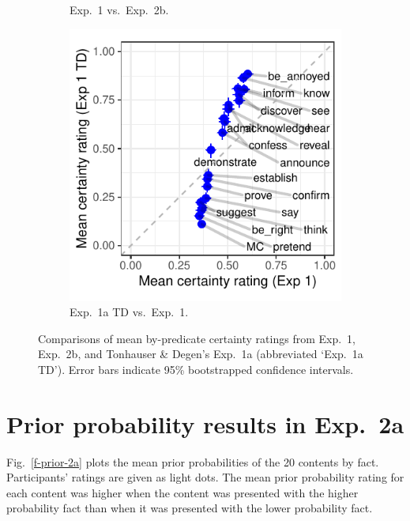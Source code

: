 \documentclass[11pt,fleqn]{article}
\newcommand{\figref}[1]{Fig.~\ref{#1}}
\newcommand{\6}{\mbox{$[\hspace*{-.6mm}[$}}
\newcommand{\9}{\mbox{$]\hspace*{-.6mm}]$}}
\begin{document}
\begin{figure}[h!]
\begin{subfigure}{.33\textwidth}
\caption{Exp.~1 vs.\ Exp.~2b.}
\label{f-projcomp2}
\end{subfigure}
\begin{subfigure}{.33\textwidth}
\includegraphics[width=\textwidth]{../../results/projection-comparisons/graphs/projection-comparison-59}
\caption{Exp.~1a TD vs.\  Exp.~1.}
\label{f-projcomp3}
\end{subfigure}
\caption{Comparisons of mean by-predicate certainty ratings from Exp.~1, Exp.~2b, and Tonhauser \& Degen's Exp.~1a (abbreviated `Exp.~1a TD'). Error bars indicate 95\% bootstrapped confidence intervals.}
\label{f-projection-comparisons}
\end{figure}

\section{Prior probability results in Exp.~2a}\label{a-exp2}

\figref{f-prior-2a} plots the mean prior probabilities of the 20 contents by fact. Participants' ratings are given as light dots. The mean prior probability rating for each content was higher when the content was presented with the higher probability fact than when it was presented with the lower probability fact.
\end{document}
